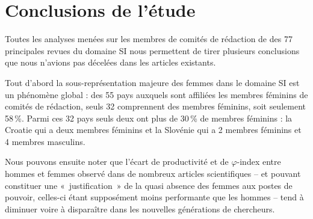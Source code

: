 	\section{Conclusions de l'étude}
		Toutes les analyses menées sur les membres de comités de rédaction de des 77 principales revues du domaine SI nous permettent de tirer plusieurs conclusions que nous n'avions pas décelées dans les articles existants.
		
		Tout d'abord la sous-représentation majeure des femmes dans le domaine SI est un phénomène global : des 55 pays auxquels sont affiliées les membres féminins de comités de rédaction, seuls 32 comprennent des membres féminins, soit seulement 58\,\%. Parmi ces 32 pays seuls deux ont plus de 30\,\% de membres féminins : la Croatie qui a deux membres féminins et la Slovénie qui a 2 membres féminins et 4 membres masculins.
		
		Nous pouvons ensuite noter que l'écart de productivité et de $\varphi$-index entre hommes et femmes observé dans de nombreux articles scientifiques -- et pouvant constituer une «~justification~» de la quasi absence des femmes aux postes de pouvoir, celles-ci étant supposément moins performante que les hommes \citep{30, Nakhaie2002} -- tend à diminuer voire à disparaître dans les nouvelles générations de chercheurs.
		
		
	
